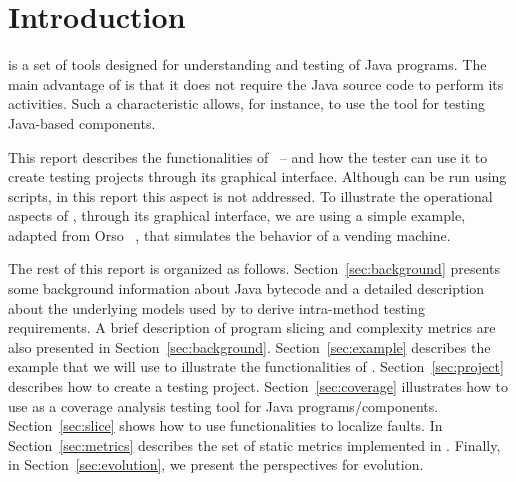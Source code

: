 
\section{Introduction}\label{sec:introduction}

\toolname is a set of tools designed for understanding and testing
of Java programs. The main advantage of \toolname is that it does
not require the Java source code to perform its activities. Such a
characteristic allows, for instance, to use the tool for testing
Java-based components.

This report describes the functionalities of \toolname\ --
\version and how the tester can use it to create testing projects
through its graphical interface. Although \toolname can be run
using scripts, in this report this aspect is not addressed. To
illustrate the operational aspects of \toolname, through its
graphical interface, we are using a simple example, adapted from
Orso \etal~\cite{Orso01UCMS}, that simulates the behavior of a
vending machine.

The rest of this report is organized as follows.
Section~\ref{sec:background} presents some background information
about Java bytecode and a detailed description about the
underlying models used by \toolname to derive intra-method testing
requirements. A brief description of program slicing and
complexity metrics are also presented in
Section~\ref{sec:background}. Section~\ref{sec:example} describes
the example that we will use to illustrate the functionalities of
\toolname. Section~\ref{sec:project} describes how to create a
testing project. Section~\ref{sec:coverage} illustrates how to use
\toolname as a coverage analysis testing tool for Java
programs/components. Section~\ref{sec:slice} shows how to use
\toolname functionalities to localize faults. In
Section~\ref{sec:metrics} describes the set of static metrics
implemented in \toolname. Finally, in Section~\ref{sec:evolution},
we present the perspectives for \toolname evolution.
